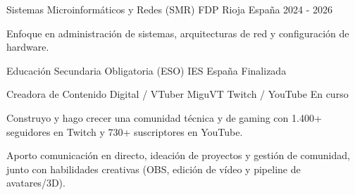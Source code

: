 \documentclass[11pt, a4paper]{awesome-cv}
\begin{document}
\begin{cventries}

  \cventry
    {Sistemas Microinformáticos y Redes (SMR)} %
    {FDP Rioja} %
    {España} %
    {2024 - 2026} %
    {
      \begin{cvitems} %
        \item {Enfoque en administración de sistemas, arquitecturas de red y configuración de hardware.}
      \end{cvitems}
    }

  \cventry
    {Educación Secundaria Obligatoria (ESO)} %
    {IES} %
    {España} %
    {Finalizada} %
    {}

\end{cventries}


\begin{cventries}
  \cventry
    {Creadora de Contenido Digital / VTuber}
    {MiguVT}
    {Twitch / YouTube}
    {En curso}
    {
      \begin{cvitems}
        \item {Construyo y hago crecer una comunidad técnica y de gaming con 1.400+ seguidores en Twitch y 730+ suscriptores en YouTube.}
        \item {Aporto comunicación en directo, ideación de proyectos y gestión de comunidad, junto con habilidades creativas (OBS, edición de vídeo y pipeline de avatares/3D).}
      \end{cvitems}
    }
\end{cventries}
\end{document}
